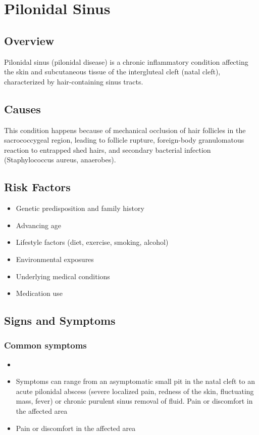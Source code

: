 \chapter{Pilonidal Sinus}
\label{sec:Pilonidal Sinus}

\section{Overview}
Pilonidal sinus (pilonidal disease) is a chronic inflammatory condition affecting the skin and subcutaneous tissue of the intergluteal cleft (natal cleft), characterized by hair-containing sinus tracts.
\section{Causes}
This condition happens because of mechanical occlusion of hair follicles in the sacrococcygeal region, leading to follicle rupture, foreign-body granulomatous reaction to entrapped shed hairs, and secondary bacterial infection (Staphylococcus aureus, anaerobes).     
\section{Risk Factors}

\begin{itemize}[noitemsep]
  \item Genetic predisposition and family history
  \item Advancing age
  \item Lifestyle factors (diet, exercise, smoking, alcohol)
  \item Environmental exposures
  \item Underlying medical conditions
  \item Medication use
\end{itemize}
\section{Signs and Symptoms}

\subsection{Common symptoms}
\begin{itemize}[noitemsep]
  \item \item Symptoms can range from an asymptomatic small pit in the natal cleft to an acute pilonidal abscess (severe localized pain, redness of the skin, fluctuating mass, fever) or chronic purulent sinus removal of fluid. Pain or discomfort in the affected area    \item Pain or discomfort in the affected area
  \end{itemize}

